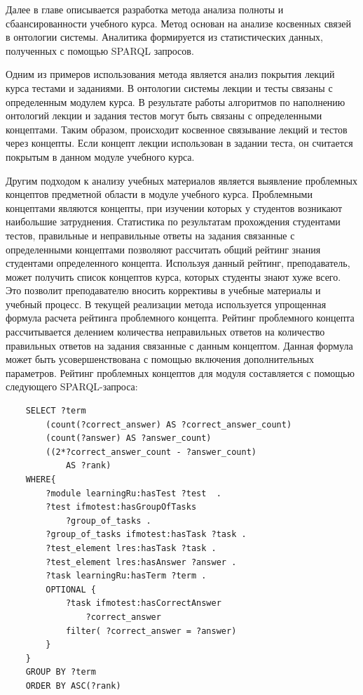 Далее в главе описывается разработка метода анализа полноты и сбаансированности  учебного курса. Метод основан на анализе косвенных связей в онтологии системы. Аналитика формируется из статистических данных, полученных с помощью SPARQL запросов. 

Одним из примеров использования метода является анализ покрытия лекций курса тестами и заданиями. В онтологии системы лекции и тесты связаны с определенным модулем курса. В результате работы алгоритмов по наполнению онтологий лекции и задания тестов могут быть связаны с определенными концептами. Таким образом, происходит косвенное связывание лекций и тестов через концепты. Если концепт лекции использован в задании теста, он считается покрытым в данном модуле учебного курса.

Другим подходом к анализу учебных материалов является выявление проблемных концептов предметной области в модуле учебного курса. Проблемными концептами являются концепты, при изучении которых у студентов возникают наибольшие затруднения. Статистика по результатам прохождения студентами тестов, правильные и неправильные ответы на задания связанные с определенными концептами позволяют рассчитать общий рейтинг знания студентами определенного концепта. Используя данный рейтинг, преподаватель, может получить список концептов курса, которых студенты знают хуже всего. Это позволит преподавателю вносить коррективы в учебные материалы и учебный процесс. В текущей реализации метода используется упрощенная формула расчета рейтинга проблемного концепта. Рейтинг проблемного концепта рассчитывается делением количества неправильных ответов на количество правильных ответов на задания связанные с данным концептом. Данная формула может быть усовершенствована с помощью включения дополнительных параметров. Рейтинг проблемных концептов для модуля составляется с помощью следующего  SPARQL-запроса:

\begin{verbatim}
    SELECT ?term 
        (count(?correct_answer) AS ?correct_answer_count)
        (count(?answer) AS ?answer_count)
        ((2*?correct_answer_count - ?answer_count) 
            AS ?rank) 
    WHERE{
        ?module learningRu:hasTest ?test  . 
        ?test ifmotest:hasGroupOfTasks 
            ?group_of_tasks .        
        ?group_of_tasks ifmotest:hasTask ?task .      
        ?test_element lres:hasTask ?task .
        ?test_element lres:hasAnswer ?answer .
        ?task learningRu:hasTerm ?term .       
        OPTIONAL { 
            ?task ifmotest:hasCorrectAnswer 
                ?correct_answer
            filter( ?correct_answer = ?answer)
        }         
    }
    GROUP BY ?term 
    ORDER BY ASC(?rank)
\end{verbatim}


